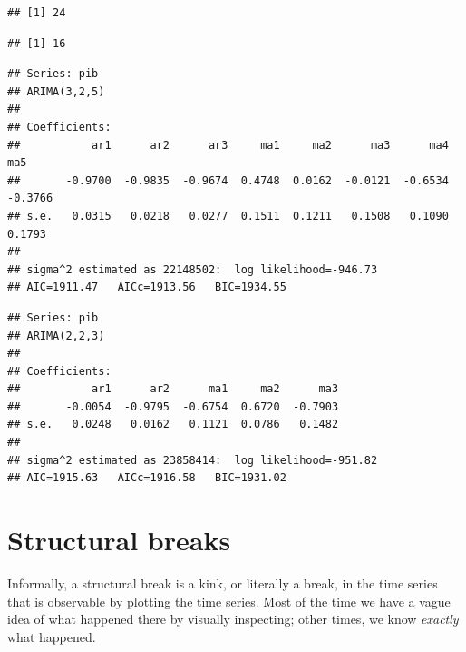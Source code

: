 \documentclass[11pt, a4paper]{report}
\newenvironment{Shaded}{\begin{snugshade}}{\end{snugshade}}
\newcommand{\KeywordTok}[1]{\textcolor[rgb]{0.13,0.29,0.53}{\textbf{#1}}}
\newcommand{\NormalTok}[1]{#1}
\newcommand{\OperatorTok}[1]{\textcolor[rgb]{0.81,0.36,0.00}{\textbf{#1}}}
\newcommand{\StringTok}[1]{\textcolor[rgb]{0.31,0.60,0.02}{#1}}
\theoremstyle{plain}
\theoremstyle{plain}
\theoremstyle{remark}
\begin{document}
\begin{Shaded}
\end{Shaded}

\begin{verbatim}
## [1] 24
\end{verbatim}

\begin{Shaded}
\end{Shaded}

\begin{verbatim}
## [1] 16
\end{verbatim}

\begin{Shaded}
\end{Shaded}

\begin{verbatim}
## Series: pib 
## ARIMA(3,2,5) 
## 
## Coefficients:
##           ar1      ar2      ar3     ma1     ma2      ma3      ma4      ma5
##       -0.9700  -0.9835  -0.9674  0.4748  0.0162  -0.0121  -0.6534  -0.3766
## s.e.   0.0315   0.0218   0.0277  0.1511  0.1211   0.1508   0.1090   0.1793
## 
## sigma^2 estimated as 22148502:  log likelihood=-946.73
## AIC=1911.47   AICc=1913.56   BIC=1934.55
\end{verbatim}

\begin{Shaded}
\end{Shaded}

\begin{verbatim}
## Series: pib 
## ARIMA(2,2,3) 
## 
## Coefficients:
##           ar1      ar2      ma1     ma2      ma3
##       -0.0054  -0.9795  -0.6754  0.6720  -0.7903
## s.e.   0.0248   0.0162   0.1121  0.0786   0.1482
## 
## sigma^2 estimated as 23858414:  log likelihood=-951.82
## AIC=1915.63   AICc=1916.58   BIC=1931.02
\end{verbatim}


\chapter{Structural breaks}


Informally, a structural break is a kink, or literally a break, in the time series that is observable by plotting the time series. Most of the time we have a vague idea of what happened there by visually inspecting; other times, we know \textit{exactly} what happened.
\end{document}
